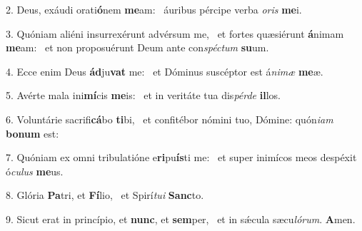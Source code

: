2. Deus, exáudi orati\textbf{ó}nem \textbf{me}am: \ast\  áuribus pércipe verba \textit{o}\textit{ris} \textbf{me}i.\

3. Quóniam aliéni insurrexérunt advérsum me, \dag\  et fortes quæsiérunt \textbf{á}nimam \textbf{me}am: \ast\  et non proposuérunt Deum ante con\textit{spéc}\textit{tum} \textbf{su}um.\

4. Ecce enim Deus \textbf{ád}ju\textbf{vat} me: \ast\  et Dóminus suscéptor est á\textit{ni}\textit{mæ} \textbf{me}æ.\

5. Avérte mala ini\textbf{mí}cis \textbf{me}is: \ast\  et in veritáte tua dis\textit{pér}\textit{de} \textbf{il}los.\

6. Voluntárie sacrifi\textbf{cá}bo \textbf{ti}bi, \ast\  et confitébor nómini tuo, Dómine: quón\textit{i}\textit{am} \textbf{bo}\textbf{num} est:\

7. Quóniam ex omni tribulatióne e\textbf{ri}pu\textbf{ís}ti me: \ast\  et super inimícos meos despéxit ó\textit{cu}\textit{lus} \textbf{me}us.\

8. Glória \textbf{Pa}tri, et \textbf{Fí}lio, \ast\  et Spirí\textit{tu}\textit{i} \textbf{Sanc}to.\

9. Sicut erat in princípio, et \textbf{nunc}, et \textbf{sem}per, \ast\  et in sǽcula sæcu\textit{ló}\textit{rum}. \textbf{A}men.\


